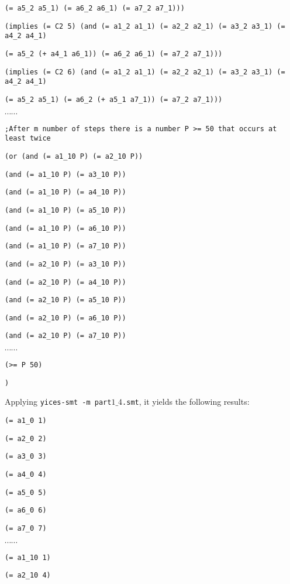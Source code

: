 {{\tt (= a5\_2 a5\_1) (= a6\_2 a6\_1) (= a7\_2 a7\_1)))}

{\tt (implies (= C2 5)  (and (= a1\_2 a1\_1) (= a2\_2 a2\_1) (= a3\_2 a3\_1) (= a4\_2 a4\_1)}

{\tt (= a5\_2 (+ a4\_1 a6\_1)) (= a6\_2 a6\_1) (= a7\_2 a7\_1)))}

{\tt (implies (= C2 6)  (and (= a1\_2 a1\_1) (= a2\_2 a2\_1) (= a3\_2 a3\_1) (= a4\_2 a4\_1)}

{\tt (= a5\_2 a5\_1) (= a6\_2 (+ a5\_1 a7\_1)) (= a7\_2 a7\_1)))}

$\cdots \cdots$

{\tt ;After m number of steps there is a number P >= 50 that occurs at least twice }
 
{\tt  (or  (and (= a1\_10 P) (= a2\_10 P))}

{\tt (and (= a1\_10 P) (= a3\_10 P))}

 {\tt (and (= a1\_10 P) (= a4\_10 P))}

 {\tt (and (= a1\_10 P) (= a5\_10 P))}

 {\tt (and (= a1\_10 P) (= a6\_10 P))}

 {\tt (and (= a1\_10 P) (= a7\_10 P))}

 {\tt (and (= a2\_10 P) (= a3\_10 P))}

 {\tt (and (= a2\_10 P) (= a4\_10 P))}

 {\tt (and (= a2\_10 P) (= a5\_10 P))}

 {\tt (and (= a2\_10 P) (= a6\_10 P))}

 {\tt (and (= a2\_10 P) (= a7\_10 P))}

$\cdots \cdots$

{\tt (>= P 50)}

{\tt )}

\vspace{3mm}

Applying {\tt yices-smt -m part$1\_4$.smt}, it yields the following results:

{\tt (= a1\_0 1)}

{\tt (= a2\_0 2)}

{\tt (= a3\_0 3)}

{\tt (= a4\_0 4)}

{\tt (= a5\_0 5)}

{\tt (= a6\_0 6)}

{\tt (= a7\_0 7)}

$\cdots \cdots$

{\tt (= a1\_10 1)}

{\tt (= a2\_10 4)}

}
